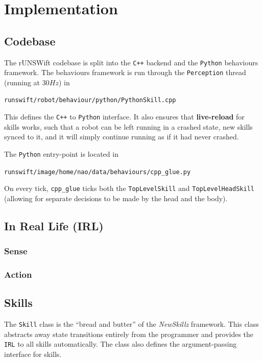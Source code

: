 \section{Implementation}

\subsection{Codebase}

The rUNSWift codebase is split into the \verb!C++! backend and the \verb!Python! behaviours framework. The behaviours framework is run through the \texttt{Perception} thread (running at $30Hz$) in 

\texttt{runswift/robot/behaviour/python/PythonSkill.cpp}

This defines the \verb!C++! to \verb!Python! interface. It also ensures that \textbf{live-reload} for skills works, such that a robot can be left running in a crashed state, new skills synced to it, and it will simply continue running as if it had never crashed.

The \verb!Python! entry-point is located in

\texttt{runswift/image/home/nao/data/behaviours/cpp\_glue.py}

On every tick, \texttt{cpp\_glue} ticks both the \texttt{TopLevelSkill} and \texttt{TopLevelHeadSkill} (allowing for separate decisions to be made by the head and the body).

\subsection{In Real Life (IRL)}

\subsubsection{Sense}

\subsubsection{Action}

\subsection{Skills}

The \texttt{Skill} class is the ``bread and butter'' of the \textit{NewSkillz} framework. This class abstracts away state transitions entirely from the programmer and provides the \texttt{IRL} to all skills automatically. The class also defines the argument-passing interface for skills.

